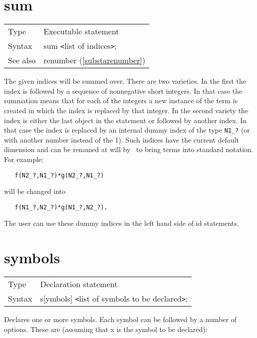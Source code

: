 \section{sum}
\label{substasum}

\noindent \begin{tabular}{ll}
Type & Executable statement\\
Syntax & sum {\tt<}list of indices{\tt>};
\\ See also & renumber (\ref{substarenumber})
\end{tabular}\vspace{4mm}

\noindent The given indices will be summed over. There are two 
varieties. In the first the index is followed by a sequence of nonnegative 
short integers. In that case the summation means that for each of the 
integers a new instance of the term is created in which the index is 
replaced by that integer. In the second variety the index is either the 
last object in the statement or followed by another index. In that case the 
index is replaced by an internal dummy 
index of the type \verb:N1_?: (or with another number 
instead of the 1). Such indices have the current
default dimension and can 
be renamed at will by \FORM\ to bring terms into standard notation. For 
example:
\begin{verbatim}
   f(N2_?,N1_?)*g(N2_?,N1_?)
\end{verbatim}
will be changed into
\begin{verbatim}
   f(N1_?,N2_?)*g(N1_?,N2_?).
\end{verbatim}
The user can use these dummy indices in the left hand side of 
id statements.
\vspace{10mm}

 
\section{symbols}
\label{substasymbols}

\noindent \begin{tabular}{ll}
Type & Declaration statement\\
Syntax & s[ymbols] {\tt<}list of symbols to be declared{\tt>};
\end{tabular}\vspace{4mm}

\noindent Declares one or more symbols. Each symbol can be 
followed by a number of options. These are (assuming that x is the symbol 
to be declared):

